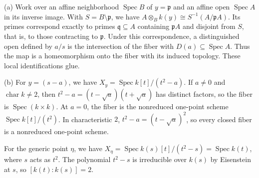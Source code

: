 (a) Work over an affine neighborhood $\operatorname{Spec}B$ of $y=\mathfrak p$ and an affine open $\operatorname{Spec}A$ in its inverse image. With $S=B\setminus\mathfrak p$, we have $A\otimes_Bk(y)\cong S^{-1}(A/\mathfrak pA)$. Its primes correspond exactly to primes $\mathfrak q\subseteq A$ containing $\mathfrak pA$ and disjoint from $S$, that is, to those contracting to $\mathfrak p$. Under this correspondence, a distinguished open defined by $a/s$ is the intersection of the fiber with $D(a)\subseteq\operatorname{Spec}A$. Thus the map is a homeomorphism onto the fiber with its induced topology. These local identifications glue.

(b) For $y=(s-a)$, we have $X_y=\operatorname{Spec}k[t]/(t^2-a)$. If $a\ne0$ and $\operatorname{char}k\ne2$, then $t^2-a=(t-\sqrt a)(t+\sqrt a)$ has distinct factors, so the fiber is $\operatorname{Spec}(k\times k)$. At $a=0$, the fiber is the nonreduced one-point scheme $\operatorname{Spec}k[t]/(t^2)$. In characteristic $2$, $t^2-a=(t-\sqrt a)^2$, so every closed fiber is a nonreduced one-point scheme.

For the generic point $\eta$, we have $X_\eta=\operatorname{Spec}k(s)[t]/(t^2-s)=\operatorname{Spec}k(t)$, where $s$ acts as $t^2$. The polynomial $t^2-s$ is irreducible over $k(s)$ by Eisenstein at $s$, so $[k(t):k(s)]=2$.

